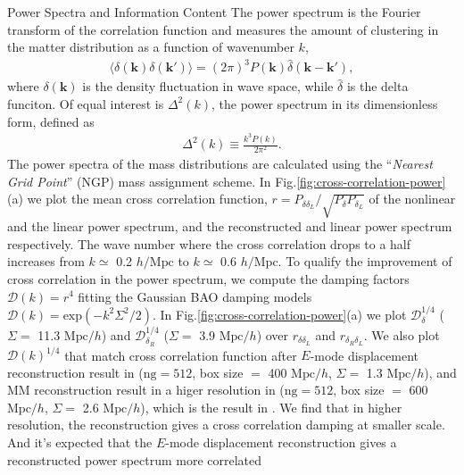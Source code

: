 \begin{section}{Power Spectra and Information Content}
  \label{sec:fisherinfo}
    The power spectrum is the Fourier transform of the correlation function and measures
 the amount of clustering in the matter distribution as a function of wavenumber $k$,
\begin{align}
    \langle \delta \left( \bm{k} \right) \delta \left( \bm{k'}\right) \rangle =
\left( 2\pi \right) ^3 P \left( \bm{k} \right) \hat{\delta} \left( \bm{k}-\bm{k'} \right),
\end{align}
where $\delta \left( \bm{k} \right)$ is the density fluctuation in wave space, while 
$\hat{\delta}$ is the delta funciton. Of equal interest is $\Delta ^2(k)$, the power 
spectrum in its dimensionless form, defined as
\begin{align}
    \Delta ^2(k) \equiv \frac{k^3 P \left( k \right)}{2\pi ^2}.
\end{align}
    The power spectra of the mass distributions are calculated using the \enquote{\textit{Nearest Grid Point}} 
(NGP) mass assignment scheme. In Fig.\ref{fig:cross-correlation-power}(a) we plot the mean cross correlation 
function, $r=P_{\delta \delta_L}/\sqrt{P_\delta P_{\delta_L}}$ of the nonlinear and the 
linear power spectrum, and the reconstructed and 
linear power spectrum respectively. The wave number where the cross correlation drops to a half increases 
from $k\simeq$ 0.2 $h/\mathrm{Mpc}$ to $k \simeq$ 0.6 $h/\mathrm{Mpc}$. 
To qualify the improvement of cross correlation in the 
power spectrum, we compute the damping factors $\mathcal{D}(k)=r^4$ fitting the Gaussian BAO damping models 
$\mathcal{D}(k)=\mathrm{exp}(-k^2 \Sigma^2/2)$. In Fig.\ref{fig:cross-correlation-power}(a) 
we plot $\mathcal{D}_\delta^{1/4}$ ($\Sigma =$ 11.3 $\mathrm{Mpc}/h$) and $\mathcal{D}_{\delta_R}^{1/4}$ 
($\Sigma = $ 3.9 $\mathrm{Mpc}/h$) over $r_{\delta\delta_L}$ and $r_{\delta_R\delta_L}$. 
We also plot $\mathcal{D}(k)^{1/4}$ 
that match cross correlation function after $E$-mode displacement 
reconstruction result in \cite{bib:Yu2016} ($\mathrm{ng}=512$, box size $=$ 400 $\mathrm{Mpc}/h$, $\Sigma =$ 1.3 $\mathrm{Mpc}/h$), and 
MM reconstruction result in a higer resolution in \cite{bib:ZhuH2016} ($\mathrm{ng}=512$, 
box size $=$ 600 $\mathrm{Mpc}/h$, $\Sigma =$ 2.6 $\mathrm{Mpc}/h$), 
which is the result in \cite{bib:ZhuH2016}. We find that in higher resolution, 
the reconstruction gives a cross correlation damping at smaller scale. 
And it's expected that the $E$-mode displacement reconstruction gives a reconstructed power spectrum more correlated 

\end{section}

